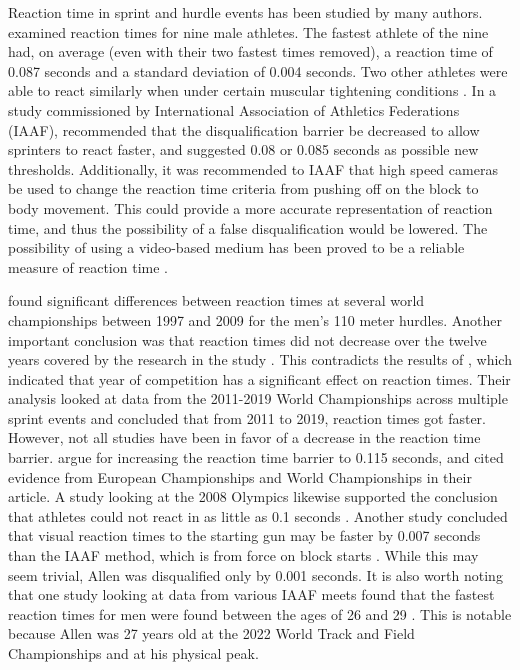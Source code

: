 \documentclass[12pt, letterpaper, titlepage]{article}
\begin{document}
Reaction time in sprint and hurdle events has been studied by many authors.
\citet{pain2007sprint} examined
reaction times for nine male athletes.  The
fastest athlete of the nine had, on average (even with their two fastest times 
removed), a reaction time of 0.087 seconds and a standard deviation of 0.004
seconds.  Two other athletes were able to react similarly when under certain
muscular tightening conditions \citep{pain2007sprint}. 
In a study commissioned by International Association of Athletics Federations 
(IAAF), \citet{komi2009iaaf} recommended that the disqualification 
barrier be decreased to allow sprinters to
react faster, and suggested 0.08 or 0.085 seconds as possible new thresholds.
Additionally, it was recommended to IAAF that high speed cameras be used to
change the reaction time criteria from pushing off on the block to body
movement. This could provide a more accurate representation of reaction time, 
and thus the possibility of a false disqualification would be lowered.
The possibility of using a video-based medium has been proved to be a reliable
measure of reaction time \citep{mudric2015evaluation}.


\citet{pilianidis2012start} found
significant differences between reaction times at several world championships
between 1997 and 2009 for the men's 110 meter hurdles.  Another important
conclusion was that reaction times did not decrease over the twelve years
covered by the research in the study \citep{pilianidis2012start}. This 
contradicts the results of \citet{zhang2021correlation}, which indicated that 
year of competition has a significant effect on reaction times.  Their
analysis looked at data from the 2011-2019 World Championships across multiple
sprint events and concluded that from 2011 to 2019, reaction times got
faster. However, not all studies have been in favor of a decrease in the
reaction time barrier. \citet*{brosnan2017effects} argue for increasing 
the reaction time barrier to 0.115 seconds, and cited evidence from European 
Championships and World Championships in their article.  A study looking 
at the 2008 Olympics likewise supported the conclusion that athletes could not
react in as little as 0.1 seconds \citep{lipps2011implications}.  Another study
concluded that visual reaction times to the starting gun may be faster by 0.007
seconds than the IAAF method, which is from force on block starts 
\citep{holmes2018method}.  While this may seem trivial, Allen was disqualified
only by 0.001 seconds. It is also worth noting that one study looking at data 
from various IAAF meets found that the fastest reaction times for men were found
between the ages of 26 and 29 \citep{tonnessen2013reaction}.  This is notable 
because Allen was 27 years old at the 2022 World Track and Field Championships 
and at his physical peak.
\end{document}

